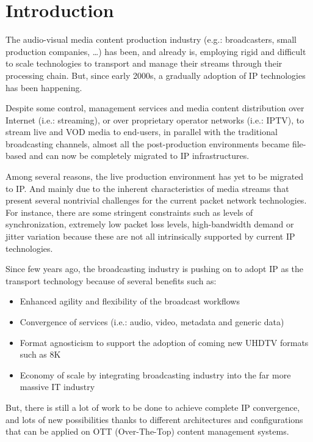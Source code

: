 \cleardoublepage
{}
\chapter*{Introduction}

The audio-visual media content production industry (e.g.: broadcasters, small production companies, \ldots) has been, and already is, employing rigid and difficult to scale technologies to transport and manage their streams through their processing chain. But, since early 2000s, a gradually adoption of IP technologies has been happening.

Despite some control, management services and media content distribution over Internet (i.e.: streaming), or over proprietary operator networks (i.e.: IPTV), to stream live and VOD media to end-users, in parallel with the traditional broadcasting channels, almost all the post-production environments became file-based and can now be completely migrated to IP infrastructures. 

Among several reasons, the live production environment has yet to be migrated to IP. And mainly due to the inherent characteristics of media streams that present several nontrivial challenges for the current packet network technologies. For instance, there are some stringent constraints such as levels of synchronization, extremely low packet loss levels, high-bandwidth demand or jitter variation because these are not all intrinsically supported by current IP technologies.

Since few years ago, the broadcasting industry is pushing on to adopt IP as the transport technology because of several benefits such as:

\begin{itemize}
  \item Enhanced agility and flexibility of the broadcast workflows
  \item Convergence of services (i.e.: audio, video, metadata and generic data)
  \item Format agnosticism to support the adoption of coming new UHDTV formats such as 8K 
  \item Economy of scale by integrating broadcasting industry into the far more massive IT industry
\end{itemize}

But, there is still a lot of work to be done to achieve complete IP convergence, and lots of new possibilities thanks to different architectures and configurations that can be applied on OTT (Over-The-Top) content management systems. 

